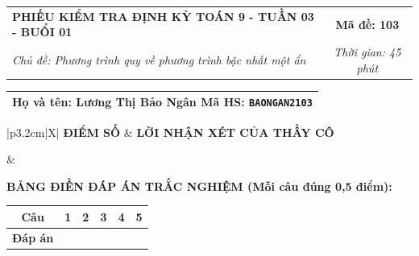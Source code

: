 \documentclass[12pt,a4paper]{article}
\begin{document}
\newpage


\noindent
\begin{tabularx}{\linewidth}{|X|c|}
\hline
\textbf{PHIẾU KIỂM TRA ĐỊNH KỲ TOÁN 9 - TUẦN 03 - BUỔI 01} & \textbf{Mã đề: 103} \\
\textit{Chủ đề: Phương trình quy về phương trình bậc nhất một ẩn} & \textit{Thời gian: 45 phút} \\
\hline
\end{tabularx}

\vspace{1mm}

\noindent
\begin{tabularx}{\linewidth}{|X|}
\hline
\rule[-2mm]{0pt}{7.5mm}\textbf{Họ và tên:} \textbf{\large Lương Thị Bảo Ngân} \hfill \textbf{Mã HS:} \texttt{BAONGAN2103} \quad \\
\hline
\end{tabularx}

\vspace{1mm}

\noindent
\begin{tabularx}{\linewidth}{|p{3.2cm}|X|}
\hline
\centering\textbf{ĐIỂM SỐ} & \centering\textbf{LỜI NHẬN XÉT CỦA THẦY CÔ} \tabularnewline
\hline
\rule{0pt}{1.3cm} & \tabularnewline
\hline
\end{tabularx}

\vspace{1.2mm}

\noindent\textbf{BẢNG ĐIỀN ĐÁP ÁN TRẮC NGHIỆM (Mỗi câu đúng 0,5 điểm):}
\vspace{0.8mm}

\noindent
\renewcommand{\arraystretch}{1.35}
\begin{tabularx}{\linewidth}{|c|*{5}{>{\centering\arraybackslash}X|}}
\hline
\textbf{Câu} & \textbf{1} & \textbf{2} & \textbf{3} & \textbf{4} & \textbf{5} \\
\hline
\textbf{Đáp án} & & & & & \\
\hline
\end{tabularx}
\renewcommand{\arraystretch}{1.0}

\vspace{1.5mm}
\end{document}
